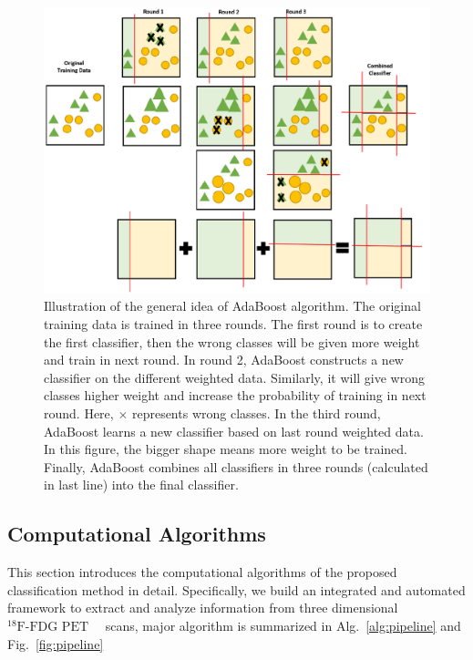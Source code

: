 \documentclass[authoryear,preprint,revi	ew,12pt]{elsarticle}
\newcommand{\FDGPET}   {$ ^{18}\textrm{F-FDG PET} $~}
\begin{document}
\begin{centering}
	\begin{figure}
		\centering
		\includegraphics[width=\linewidth]{figures/adaboost.png}
		\caption[Illustration of the AdoBoost Algorithm.]{Illustration of the general idea of AdaBoost algorithm. The original training data is trained in three rounds. The first round is to create the first classifier, then the wrong classes will be given more weight and train in next round. In round 2, AdaBoost constructs a new classifier on the different weighted data. Similarly, it will give wrong classes higher weight and increase the probability of training in next round. Here, $ \times $ represents wrong classes. In the third round, AdaBoost learns a new classifier based on last round weighted data. In this figure, the bigger shape means more weight to be trained. Finally, AdaBoost combines all classifiers in three rounds (calculated in last line) into the final classifier.}
		\label{fig:adaboost}
	\end{figure}
\end{centering}

\subsection{Computational Algorithms}
\label{sec:computational_algorithm}

This section introduces the computational algorithms of the proposed classification method in detail. Specifically, we build an integrated and automated framework to extract and analyze information from three dimensional \FDGPET~ scans, major algorithm is summarized in Alg.~\ref{alg:pipeline} and Fig.~\ref{fig:pipeline}
\end{document}
